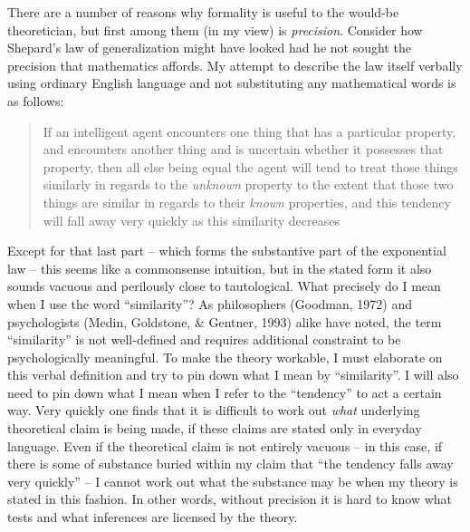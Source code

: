 \documentclass[
  english,
  doc]{apa6}
\begin{document}
There are a number of reasons why formality is useful to the would-be theoretician, but first among them (in my view) is \emph{precision}. Consider how Shepard's law of generalization might have looked had he not sought the precision that mathematics affords. My attempt to describe the law itself verbally using ordinary English language and not substituting any mathematical words is as follows:

\begin{quote}
If an intelligent agent encounters one thing that has a particular property, and encounters another thing and is uncertain whether it possesses that property, then all else being equal the agent will tend to treat those things similarly in regards to the \emph{unknown} property to the extent that those two things are similar in regards to their \emph{known} properties, and this tendency will fall away very quickly as this similarity decreases
\end{quote}

\noindent
Except for that last part -- which forms the substantive part of the exponential law -- this seems like a commonsense intuition, but in the stated form it also sounds vacuous and perilously close to tautological. What precisely do I mean when I use the word \enquote{similarity}? As philosophers (Goodman, 1972) and psychologists (Medin, Goldstone, \& Gentner, 1993) alike have noted, the term \enquote{similarity} is not well-defined and requires additional constraint to be psychologically meaningful. To make the theory workable, I must elaborate on this verbal definition and try to pin down what I mean by \enquote{similarity}. I will also need to pin down what I mean when I refer to the \enquote{tendency} to act a certain way. Very quickly one finds that it is difficult to work out \emph{what} underlying theoretical claim is being made, if these claims are stated only in everyday language. Even if the theoretical claim is not entirely vacuous -- in this case, if there is some of substance buried within my claim that \enquote{the tendency falls away very quickly} -- I cannot work out what the substance may be when my theory is stated in this fashion. In other words, without precision it is hard to know what tests and what inferences are licensed by the theory.
\end{document}
